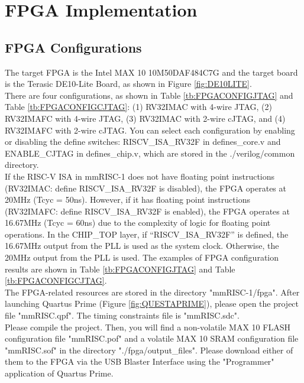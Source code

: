 \section{FPGA Implementation}

\subsection{FPGA Configurations}

The target FPGA is the Intel MAX 10 10M50DAF484C7G and the target board is the Terasic DE10-Lite Board, as shown in Figure \ref{fig:DE10LITE}.\\

There are four configurations, as shown in Table \ref{tb:FPGACONFIGJTAG} and Table \ref{tb:FPGACONFIGCJTAG}: (1) RV32IMAC with 4-wire JTAG, (2) RV32IMAFC with 4-wire JTAG, (3) RV32IMAC with 2-wire cJTAG, and (4) RV32IMAFC with 2-wire cJTAG. You can select each configuration by enabling or disabling the \textasciigrave define switches: RISCV\_ISA\_RV32F in defines\_core.v and ENABLE\_CJTAG in defines\_chip.v, which are stored in the ./verilog/common directory.\\

If the RISC-V ISA in mmRISC-1 does not have floating point instructions (RV32IMAC: \textasciigrave define RISCV\_ISA\_RV32F is disabled), the FPGA operates at 20MHz (Tcyc = 50ns). However, if it has floating point instructions (RV32IMAFC: \textasciigrave define RISCV\_ISA\_RV32F is enabled), the FPGA operates at 16.67MHz (Tcyc = 60ns) due to the complexity of logic for floating point operations. In the CHIP\_TOP layer, if “\textasciigrave RISCV\_ISA\_RV32F” is defined, the 16.67MHz output from the PLL is used as the system clock. Otherwise, the 20MHz output from the PLL is used. The examples of FPGA configuration results are shown in Table \ref{tb:FPGACONFIGJTAG} and Table \ref{tb:FPGACONFIGCJTAG}.\\

The FPGA-related resources are stored in the directory "mmRISC-1/fpga". After launching Quartus Prime (Figure \ref{fig:QUESTAPRIME}), please open the project file "mmRISC.qpf". The timing constraints file is "mmRISC.sdc". \\

Please compile the project. Then, you will find a non-volatile MAX 10 FLASH configuration file "mmRISC.pof" and a volatile MAX 10 SRAM configuration file "mmRISC.sof" in the directory "./fpga/output\_files". Please download either of them to the FPGA via the USB Blaster Interface using the "Programmer" application of Quartus Prime.


